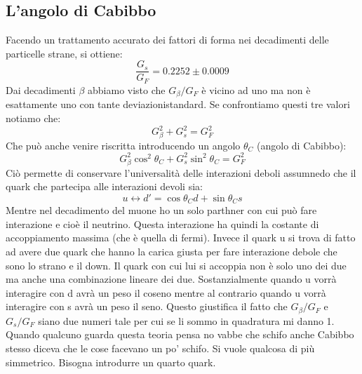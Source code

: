 \subsection{L'angolo di Cabibbo}
Facendo un trattamento accurato dei fattori di forma nei decadimenti delle particelle strane, si ottiene:
\begin{equation*}
    \frac{G_s}{G_F}=0.2252\pm0.0009
\end{equation*}
Dai decadimenti $\beta$ abbiamo visto che $G_\beta/G_F$ è vicino ad uno ma non è esattamente uno con tante deviazionistandard. Se confrontiamo questi tre valori notiamo che:
\begin{equation*}
    G_\beta^2+G_s^2=G_F^2
\end{equation*}
Che può anche venire riscritta introducendo un angolo $\theta_C$ (angolo di Cabibbo):
\begin{equation*}
    G_\beta^2\cos^2{\theta_C}+G_s^2\sin^2{\theta_C}=G_F^2
\end{equation*}
Ciò permette di conservare l'universalità delle interazioni deboli assumnedo che il quark che partecipa alle interazioni devoli sia:
\begin{equation*}
    u\leftrightarrow d'=\cos{\theta_C}d+\sin{\theta_C}s
\end{equation*}
Mentre nel decadimento del muone ho un solo parthner con cui può fare interazione e cioè il neutrino. Questa interazione ha quindi la costante di accoppiamento massima (che è quella di fermi). Invece il quark u si trova di fatto ad avere due quark che hanno la carica giusta per fare interazione debole che sono lo strano e il down. Il quark con cui lui si accoppia non è solo uno dei due ma anche una combinazione lineare dei due. Sostanzialmente quando u vorrà interagire con d avrà un peso il coseno mentre al contrario quando u vorrà interagire con s avrà un peso il seno. Questo giustifica il fatto che $G_\beta/G_F$ e $G_s/G_F$ siano due numeri tale per cui se li sommo in quadratura mi danno 1. Quando qualcuno guarda questa teoria pensa no vabbe che schifo anche Cabibbo stesso diceva che le cose facevano un po' schifo. Si vuole qualcosa di più simmetrico. Bisogna introdurre un quarto quark.
